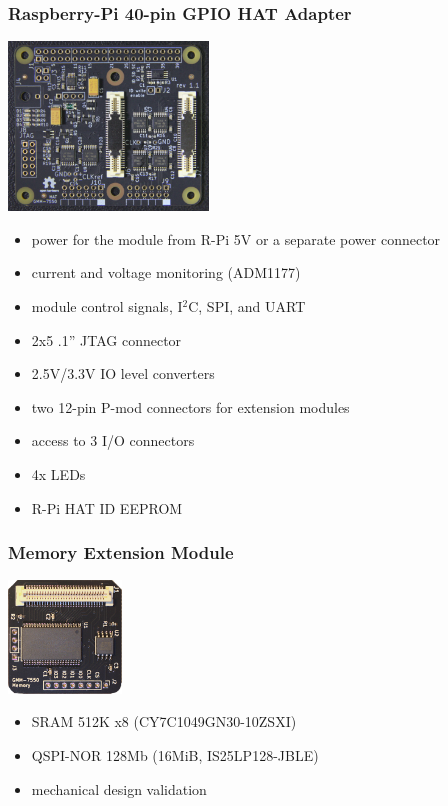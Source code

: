 \begin{frame}
  \frametitle{Raspberry-Pi 40-pin GPIO HAT Adapter}
  \begin{flushright}
    \includegraphics[angle=90, height=4.5cm]{hat-gmm7550.jpg}
  \end{flushright}
  \vspace{-5cm}

  \begin{minipage}{9cm}
  \begin{itemize}
  \item power for the module from R-Pi 5V or a separate power connector
  \item current and voltage monitoring (ADM1177)
  \item module control signals, I$^2$C, SPI, and UART
  \item 2x5 .1'' JTAG connector
  \item 2.5V/3.3V IO level converters
  \item two 12-pin P-mod connectors for extension modules
  \item access to 3 I/O connectors
  \item 4x LEDs
  \item R-Pi HAT ID EEPROM
  \end{itemize}
  \end{minipage}
\end{frame}

\begin{frame}
  \frametitle{Memory Extension Module}
  \begin{flushright}
    \includegraphics[height=3cm]{mem-module.jpg}
  \end{flushright}
  \vspace{-3cm}

  \begin{minipage}{9cm}
  \begin{itemize}
  \item SRAM 512K x8 (CY7C1049GN30-10ZSXI)
  \item QSPI-NOR 128Mb (16MiB, IS25LP128-JBLE)
  \vspace{.5cm}
  \item mechanical design validation
  \end{itemize}
  \end{minipage}
\end{frame}

